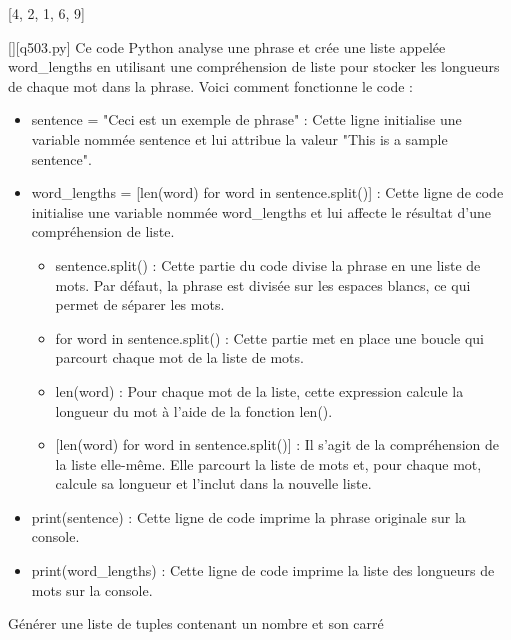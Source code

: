 [4, 2, 1, 6, 9]
        \par
        \begin{solution}
            \renewcommand{\nomfichier}{q503.py}
            \pythonfile{\chemincode \nomfichier}[][\nomfichier]
            Ce code Python analyse une phrase et crée une liste appelée word\_lengths en utilisant une compréhension de liste pour stocker les longueurs de chaque mot dans la phrase. Voici comment fonctionne le code :\par

\begin{itemize}
\item     sentence = "Ceci est un exemple de phrase" : Cette ligne initialise une variable nommée sentence et lui attribue la valeur "This is a sample sentence".
\item     word\_lengths = [len(word) for word in sentence.split()] : Cette ligne de code initialise une variable nommée word\_lengths et lui affecte le résultat d'une compréhension de liste.

\begin{itemize}
\item         sentence.split() : Cette partie du code divise la phrase en une liste de mots. Par défaut, la phrase est divisée sur les espaces blancs, ce qui permet de séparer les mots.
\item         for word in sentence.split() : Cette partie met en place une boucle qui parcourt chaque mot de la liste de mots.
\item         len(word) : Pour chaque mot de la liste, cette expression calcule la longueur du mot à l'aide de la fonction len().
\item{}         [len(word) for word in sentence.split()] : Il s'agit de la compréhension de la liste elle-même. Elle parcourt la liste de mots et, pour chaque mot, calcule sa longueur et l'inclut dans la nouvelle liste.
\end{itemize}
\item    print(sentence) : Cette ligne de code imprime la phrase originale sur la console.
\item    print(word\_lengths) : Cette ligne de code imprime la liste des longueurs de mots sur la console.
 \end{itemize}
        \end{solution}
        

        \question
        
        Générer une liste de tuples contenant un nombre et son carré

